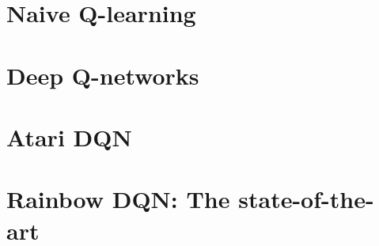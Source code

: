 \section{Naive Q-learning}

\section{Deep Q-networks}

\section{Atari DQN}

\section{Rainbow DQN: The state-of-the-art}